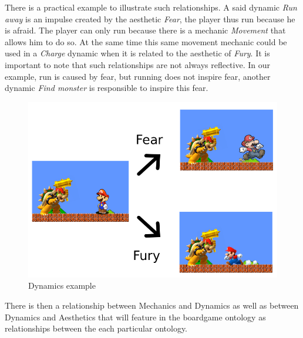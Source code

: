  There is a practical example to illustrate such relationships. A said dynamic \textit{Run away} is an impulse created by the aesthetic \textit{Fear}, the player thus run because he is afraid. The player can only run because there is a mechanic \textit{Movement} that allows him to do so. At the same time this same movement mechanic could be used in a \textit{Charge} dynamic when it is related to the aesthetic of \textit{Fury}. It is important to note that such relationships are not always reflective. In our example, run is caused by fear, but running does not inspire fear, another dynamic \textit{Find monster} is responsible to inspire this fear.
 
 \begin{figure}[h!]
     \centering 
     \includegraphics[scale = 0.55]{Images/MarioDiagram.png}
     \caption{Dynamics example}
     \label{fig:dynamicexample}
 \end{figure}

There is then a relationship between Mechanics and Dynamics as well as between Dynamics and Aesthetics that will feature in the boardgame ontology as relationships between the each particular ontology.